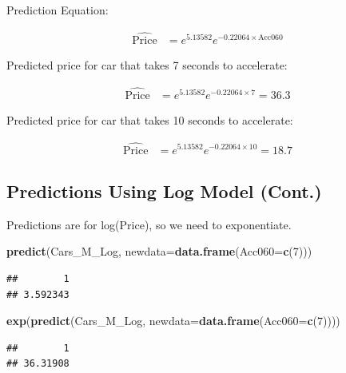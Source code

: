 \documentclass[]{book}
\newenvironment{Shaded}{\begin{snugshade}}{\end{snugshade}}
\newcommand{\KeywordTok}[1]{\textcolor[rgb]{0.13,0.29,0.53}{\textbf{#1}}}
\newcommand{\DataTypeTok}[1]{\textcolor[rgb]{0.13,0.29,0.53}{#1}}
\newcommand{\DecValTok}[1]{\textcolor[rgb]{0.00,0.00,0.81}{#1}}
\newcommand{\NormalTok}[1]{#1}
\begin{document}
Prediction Equation:

\[
\begin{aligned}
\widehat{\text{Price}} & = e^{5.13582}e^{-0.22064 \times \text{Acc060}}
\end{aligned}
\]

Predicted price for car that takes 7 seconds to accelerate:

\[
\begin{aligned}
\widehat{\text{Price}} & = e^{5.13582}e^{-0.22064 \times \text{7}} = 36.3
\end{aligned}
\]

Predicted price for car that takes 10 seconds to accelerate:

\[
\begin{aligned}
\widehat{\text{Price}} & = e^{5.13582}e^{-0.22064 \times \text{10}}= 18.7
\end{aligned}
\]

\subsection{Predictions Using Log Model
(Cont.)}\label{predictions-using-log-model-cont.}

Predictions are for log(Price), so we need to exponentiate.

\begin{Shaded}
\begin{Highlighting}[]
\KeywordTok{predict}\NormalTok{(Cars_M_Log, }\DataTypeTok{newdata=}\KeywordTok{data.frame}\NormalTok{(}\DataTypeTok{Acc060=}\KeywordTok{c}\NormalTok{(}\DecValTok{7}\NormalTok{)))}
\end{Highlighting}
\end{Shaded}

\begin{verbatim}
##        1 
## 3.592343
\end{verbatim}

\begin{Shaded}
\begin{Highlighting}[]
\KeywordTok{exp}\NormalTok{(}\KeywordTok{predict}\NormalTok{(Cars_M_Log, }\DataTypeTok{newdata=}\KeywordTok{data.frame}\NormalTok{(}\DataTypeTok{Acc060=}\KeywordTok{c}\NormalTok{(}\DecValTok{7}\NormalTok{))))}
\end{Highlighting}
\end{Shaded}

\begin{verbatim}
##        1 
## 36.31908
\end{verbatim}
\end{document}
